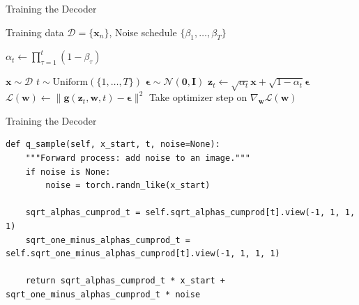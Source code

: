 \documentclass[aspectratio=169,xcolor=dvipsnames]{beamer}
\theoremstyle{named}
\newcommand{\modelg}{\mathbf{g}}
\begin{document}

\begin{frame}{Training the Decoder}

\begin{algorithmic}
    \Require Training data $\mathcal{D} = \{\mathbf{x}_n\}$, Noise schedule $\{\beta_1, \dots, \beta_T\}$
    \Statex

        \State $\alpha_t \gets \prod_{\tau=1}^{t} (1 - \beta_\tau)$ 
    \EndFor

    \Statex

    \Repeat
        \State $\mathbf{x} \sim \mathcal{D}$ 
        \State $t \sim \text{Uniform}(\{1, \dots, T\})$ 
        \State $\boldsymbol{\epsilon} \sim \mathcal{N}(\mathbf{0}, \mathbf{I})$ 
        \State $\mathbf{z}_t \gets \sqrt{\alpha_t}\mathbf{x} + \sqrt{1-\alpha_t}\boldsymbol{\epsilon}$ 
        \State $\mathcal{L}(\mathbf{w}) \gets \|\modelg(\mathbf{z}_t, \mathbf{w}, t) - \boldsymbol{\epsilon}\|^2$ 
        \State Take optimizer step on $\nabla_{\mathbf{w}}\mathcal{L}(\mathbf{w})$
\end{algorithmic}

\end{frame}


\begin{frame}[fragile]{Training the Decoder}
\scriptsize
\begin{lstlisting}
def q_sample(self, x_start, t, noise=None):
    """Forward process: add noise to an image."""
    if noise is None:
        noise = torch.randn_like(x_start)

    sqrt_alphas_cumprod_t = self.sqrt_alphas_cumprod[t].view(-1, 1, 1, 1)
    sqrt_one_minus_alphas_cumprod_t = self.sqrt_one_minus_alphas_cumprod[t].view(-1, 1, 1, 1)
    
    return sqrt_alphas_cumprod_t * x_start + sqrt_one_minus_alphas_cumprod_t * noise
\end{lstlisting}

\end{frame}

\end{document}
